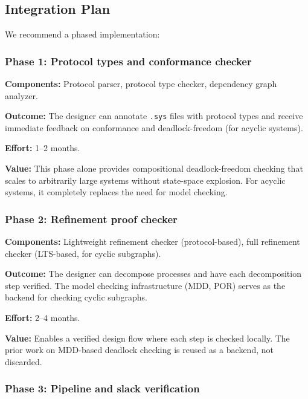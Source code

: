 \documentclass[11pt]{article}
\begin{document}
\subsection{Integration Plan}
\label{sec:integration}

We recommend a phased implementation:

\subsubsection{Phase 1: Protocol types and conformance checker}

\textbf{Components:} Protocol parser, protocol type checker, dependency
graph analyzer.

\textbf{Outcome:} The designer can annotate \texttt{.sys} files with
protocol types and receive immediate feedback on conformance and
deadlock-freedom (for acyclic systems).

\textbf{Effort:} 1--2 months.

\textbf{Value:} This phase alone provides compositional deadlock-freedom
checking that scales to arbitrarily large systems without state-space
explosion.  For acyclic systems, it completely replaces the need for
model checking.

\subsubsection{Phase 2: Refinement proof checker}

\textbf{Components:} Lightweight refinement checker (protocol-based),
full refinement checker (LTS-based, for cyclic subgraphs).

\textbf{Outcome:} The designer can decompose processes and have each
decomposition step verified.  The model checking infrastructure
(MDD, POR) serves as the backend for checking cyclic subgraphs.

\textbf{Effort:} 2--4 months.

\textbf{Value:} Enables a verified design flow where each step is
checked locally.  The prior work on MDD-based deadlock checking is
reused as a backend, not discarded.

\subsubsection{Phase 3: Pipeline and slack verification}
\end{document}
